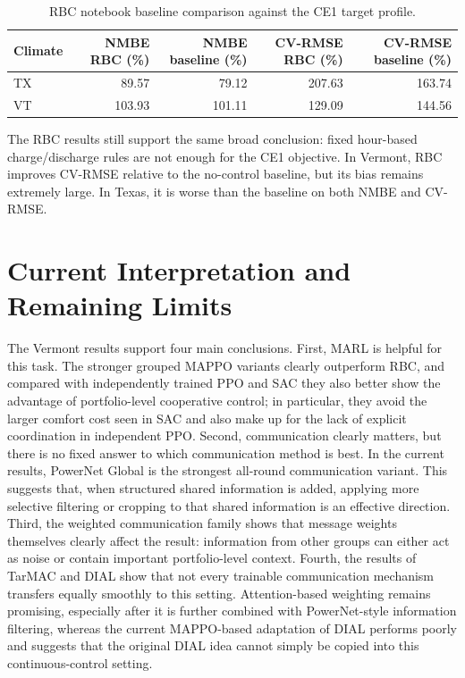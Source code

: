 \begin{table}[!htbp]
\small
\begin{center}
\begin{tabular}{|l|r|r|r|r|}
\hline
Climate & NMBE RBC (\%) & NMBE baseline (\%) & CV-RMSE RBC (\%) & CV-RMSE baseline (\%) \\
\hline
TX & 89.57 & 79.12 & 207.63 & 163.74 \\
VT & 103.93 & 101.11 & 129.09 & 144.56 \\
\hline
\end{tabular}
\end{center}
\caption{RBC notebook baseline comparison against the CE1 target profile.}
\label{tab:rbc-baseline-results}
\end{table}

The RBC results still support the same broad conclusion: fixed hour-based
charge/discharge rules are not enough for the CE1 objective. In Vermont, RBC
improves CV-RMSE relative to the no-control baseline, but its bias remains
extremely large. In Texas, it is worse than the baseline on both NMBE and
CV-RMSE.

\section{Current Interpretation and Remaining Limits}

The Vermont results support four main conclusions. First, MARL is helpful for
this task. The stronger grouped MAPPO variants clearly outperform RBC, and
compared with independently trained PPO and SAC they also better show the
advantage of portfolio-level cooperative control; in particular, they avoid the
larger comfort cost seen in SAC and also make up for the lack of explicit
coordination in independent PPO. Second, communication clearly matters, but
there is no fixed answer to which communication method is best. In the current
results, PowerNet Global is the strongest all-round communication variant. This
suggests that, when structured shared information is added, applying more
selective filtering or cropping to that shared information is an effective
direction. Third, the weighted communication family shows that message weights
themselves clearly affect the result: information from other groups can either
act as noise or contain important portfolio-level context. Fourth, the results
of TarMAC and DIAL show that not every trainable communication mechanism
transfers equally smoothly to this setting. Attention-based weighting remains
promising, especially after it is further combined with PowerNet-style
information filtering, whereas the current MAPPO-based adaptation of DIAL
performs poorly and suggests that the original DIAL idea cannot simply be
copied into this continuous-control setting.

